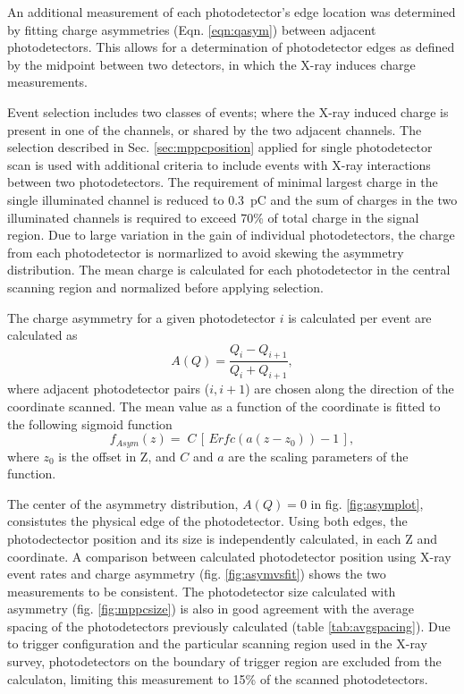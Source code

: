 An additional measurement of each photodetector's edge location was
determined by fitting charge asymmetries (Eqn. \ref{eqn:qasym}) between
adjacent photodetectors. This allows for a determination of
photodetector edges as defined by the midpoint between two detectors,
in which the X-ray induces charge measurements.

Event selection includes two classes of events; where the X-ray
induced charge is present in one of the channels, or shared by the two
adjacent channels.  The selection described in Sec.
\ref{sec:mppcposition} applied for single photodetector scan is used
with additional criteria to include events with X-ray interactions
between two photodetectors.  The requirement of minimal largest charge
in the single illuminated channel is reduced to 0.3~pC and the sum of
charges in the two illuminated channels is required to exceed 70\% of
total charge in the signal region.  Due to large variation in the gain
of individual photodetectors, the charge from each photodetector is
normarlized to avoid skewing the asymmetry distribution. The mean
charge is calculated for each photodetector in the central scanning
region and normalized before applying selection.

The charge asymmetry for a given photodetector $i$
is calculated per event are  calculated as  
\begin{equation} \label{eqn:qasym}
    A(Q)  = 
\frac{Q_{i}-Q_{i+1}}
     {Q_{i}+Q_{i+1}}, 
\end{equation}
where adjacent photodetector pairs ($i, i+1$) are chosen
along the direction of the coordinate scanned. The mean value
as a function of the coordinate is fitted to the 
following sigmoid function
\begin{equation}\label{eqn:asymfit}
f_{Asym}(z)=\;
C\,\left[\,Erfc(a(z-z_{0}))-1\,\right],
\end{equation} 
where $z_0$ is the offset in Z, and $C$ and $a$ are 
the scaling parameters of the function.

The center of the asymmetry distribution, $A(Q)=0$ in fig.
\ref{fig:asymplot}, consistutes the physical edge of the
photodetector.  Using both edges, the photodectector position and its
size is independently calculated, in each Z and \phis coordinate.  A
comparison between calculated photodetector position using X-ray event
rates and charge asymmetry (fig. \ref{fig:asymvsfit}) shows the two
measurements to be consistent.  The photodetector size calculated with
asymmetry (fig. \ref{fig:mppcsize}) is also in good agreement with the
average spacing of the photodetectors previously calculated (table
\ref{tab:avgspacing}).  Due to trigger configuration and the
particular scanning region used in the X-ray survey, photodetectors on
the boundary of trigger region are excluded from the calculaton,
limiting this measurement to 15\% of the scanned photodetectors.



